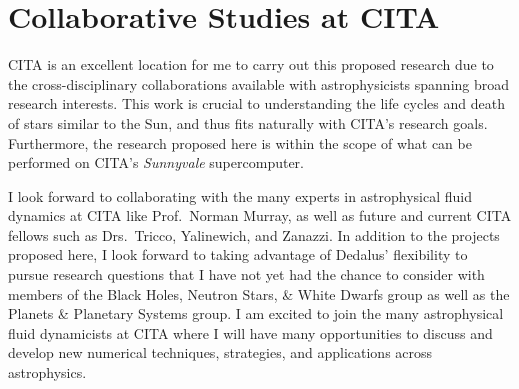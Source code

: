 \documentclass[preprint, hmargin=1in, vmargin=1in]{aastex62}
\begin{document}
\section*{\textbf{Collaborative Studies at CITA}}
CITA is an excellent location for me to carry out this proposed research due to the cross-disciplinary collaborations available with astrophysicists spanning broad research interests.
This work is crucial to understanding the life cycles and death of stars similar to the Sun, and thus fits naturally with CITA's research goals.
Furthermore, the research proposed here is within the scope of what can be performed on CITA's \emph{Sunnyvale} supercomputer.  

I look forward to collaborating with the many experts in astrophysical fluid dynamics at CITA like Prof.~Norman Murray, as well as future and current CITA fellows such as Drs.~Tricco, Yalinewich, and Zanazzi.
In addition to the projects proposed here, I look forward to taking advantage of Dedalus' flexibility to pursue research questions that I have not yet had the chance to consider with members of the Black Holes, Neutron Stars, \& White Dwarfs group as well as the Planets \& Planetary Systems group.
I am excited to join the many astrophysical fluid dynamicists at CITA where I will have many opportunities to discuss and develop new numerical techniques, strategies, and applications across astrophysics.




\end{document}

